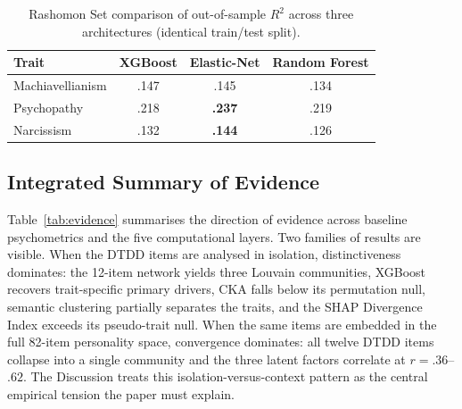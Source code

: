 \documentclass[11pt,twocolumn]{article}
\begin{document}
\begin{table}[!htbp]
\centering
\caption{Rashomon Set comparison of out-of-sample $R^2$ across three architectures (identical train/test split).}
\label{tab:rashomon}
\footnotesize
\begin{tabular}{lccc}
\toprule
Trait & XGBoost & Elastic-Net & Random Forest \\
\midrule
Machiavellianism & .147 & .145 & .134 \\
Psychopathy      & .218 & \textbf{.237} & .219 \\
Narcissism       & .132 & \textbf{.144} & .126 \\
\bottomrule
\end{tabular}
\end{table}

\subsection{Integrated Summary of Evidence}
\label{sec:integrated}

Table~\ref{tab:evidence} summarises the direction of evidence across baseline psychometrics and the five computational layers. Two families of results are visible. When the DTDD items are analysed in isolation, distinctiveness dominates: the 12-item network yields three Louvain communities, XGBoost recovers trait-specific primary drivers, CKA falls below its permutation null, semantic clustering partially separates the traits, and the SHAP Divergence Index exceeds its pseudo-trait null. When the same items are embedded in the full 82-item personality space, convergence dominates: all twelve DTDD items collapse into a single community and the three latent factors correlate at $r = .36$--$.62$. The Discussion treats this isolation-versus-context pattern as the central empirical tension the paper must explain.
\end{document}
